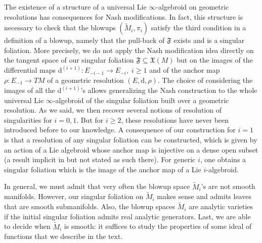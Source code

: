 \documentclass[10pt]{article}
\theoremstyle{plain}
\theoremstyle{definition}
\theoremstyle{remark}
\newcommand{\dd}{\mathrm{d}}
\begin{document}
The existence of a structure of a universal Lie $\infty$-algebroid on geometric resolutions has consequences for Nash modifications. In fact, this structure is necessary to check that the blowups $(\widetilde{M}_i,\pi_i) $ satisfy the third condition in a definition of a blowup, namely that the pull-back of $\mathfrak F$ exists and is a singular foliation.
More precisely, we do not apply the Nash modification idea  directly on the tangent space of our singular foliation $\mathfrak{F}\subseteq \mathfrak X(M)$ but on the images of the differential maps $\dd^{(i+1)}\colon E_{-i-1}\to E_{-i},\; i\geq 1$ and of the anchor map $\rho\colon E_{-1}\rightarrow TM$ of a geometric resolution $(E,\dd,\rho)$. 
 The choice of considering the images of all the $\dd^{(i+1)}$'s allows generalizing the Nash construction to the whole universal  Lie $\infty$-algebroid of the singular foliation built over a geometric resolution. As we said, we then recover several notions of resolution of singularities for $i=0,1$. 
 But for $i\geq 2$, these resolutions have never been introduced before to our knowledge. A consequence of our construction for $i=1$ is that a resolution of any singular foliation can be constructed, which is given by an action of a Lie algebroid whose anchor map is injective on a dense open subset (a result implicit in \cite{MohsenOmar} but not stated as such there). For generic $i$, one obtains a singular foliation which is the image of the anchor map of a Lie $i$-algebroid.

 
 In general, we must admit that very often the blowup space $\widetilde M_i$'s are not smooth manifolds. However, our singular foliation on $\widetilde M_i$ makes sense and admits leaves that are smooth submanifolds. Also, the blowup spaces $\widetilde M_i$ are analytic varieties if the initial singular foliation admits real analytic generators. Last, we are able to decide when $ \widetilde{M}_i$ is smooth: it suffices to study the properties of some ideal of functions that we describe in the text.
 
\end{document}
